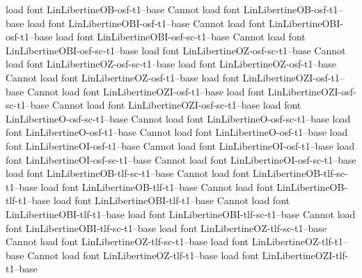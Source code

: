 {{{{{{{%
load font	LinLibertineOB-osf-t1--base
Cannot load font LinLibertineOB-osf-t1--base
load font	LinLibertineOBI-osf-t1--base
Cannot load font LinLibertineOBI-osf-t1--base
load font	LinLibertineOBI-osf-sc-t1--base
Cannot load font LinLibertineOBI-osf-sc-t1--base
load font	LinLibertineOZ-osf-sc-t1--base
Cannot load font LinLibertineOZ-osf-sc-t1--base
load font	LinLibertineOZ-osf-t1--base
Cannot load font LinLibertineOZ-osf-t1--base
load font	LinLibertineOZI-osf-t1--base
Cannot load font LinLibertineOZI-osf-t1--base
load font	LinLibertineOZI-osf-sc-t1--base
Cannot load font LinLibertineOZI-osf-sc-t1--base
load font	LinLibertineO-osf-sc-t1--base
Cannot load font LinLibertineO-osf-sc-t1--base
load font	LinLibertineO-osf-t1--base
Cannot load font LinLibertineO-osf-t1--base
load font	LinLibertineOI-osf-t1--base
Cannot load font LinLibertineOI-osf-t1--base
load font	LinLibertineOI-osf-sc-t1--base
Cannot load font LinLibertineOI-osf-sc-t1--base
load font	LinLibertineOB-tlf-sc-t1--base
Cannot load font LinLibertineOB-tlf-sc-t1--base
load font	LinLibertineOB-tlf-t1--base
Cannot load font LinLibertineOB-tlf-t1--base
load font	LinLibertineOBI-tlf-t1--base
Cannot load font LinLibertineOBI-tlf-t1--base
load font	LinLibertineOBI-tlf-sc-t1--base
Cannot load font LinLibertineOBI-tlf-sc-t1--base
load font	LinLibertineOZ-tlf-sc-t1--base
Cannot load font LinLibertineOZ-tlf-sc-t1--base
load font	LinLibertineOZ-tlf-t1--base
Cannot load font LinLibertineOZ-tlf-t1--base
load font	LinLibertineOZI-tlf-t1--base
}}}}}}}
